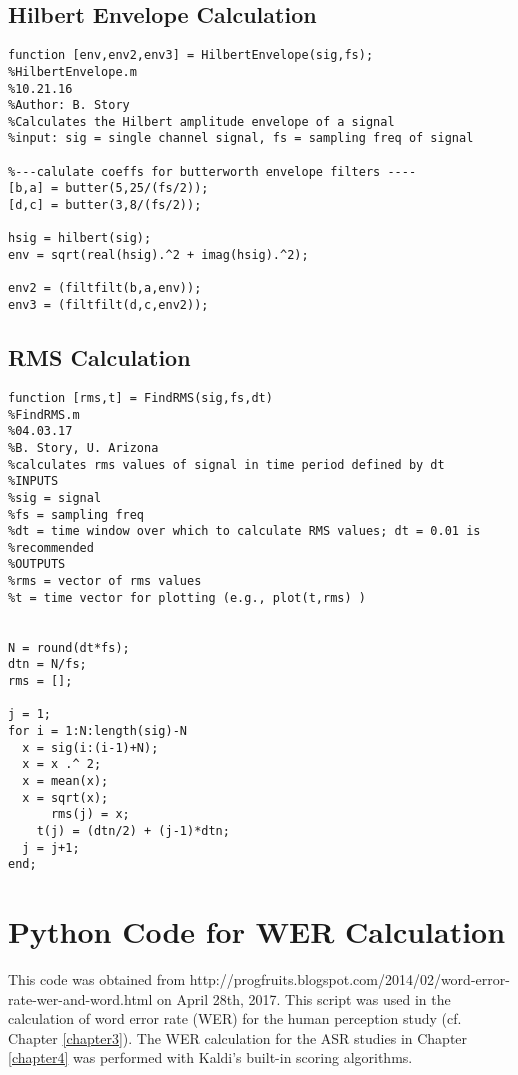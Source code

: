 \subsection{Hilbert Envelope Calculation}

\begin{lstlisting}
function [env,env2,env3] = HilbertEnvelope(sig,fs);
%HilbertEnvelope.m
%10.21.16
%Author: B. Story
%Calculates the Hilbert amplitude envelope of a signal
%input: sig = single channel signal, fs = sampling freq of signal

%---calulate coeffs for butterworth envelope filters ----
[b,a] = butter(5,25/(fs/2));
[d,c] = butter(3,8/(fs/2));

hsig = hilbert(sig);
env = sqrt(real(hsig).^2 + imag(hsig).^2);

env2 = (filtfilt(b,a,env));
env3 = (filtfilt(d,c,env2));
\end{lstlisting}


\subsection{RMS Calculation}

\begin{lstlisting}
function [rms,t] = FindRMS(sig,fs,dt)
%FindRMS.m
%04.03.17
%B. Story, U. Arizona
%calculates rms values of signal in time period defined by dt
%INPUTS
%sig = signal
%fs = sampling freq
%dt = time window over which to calculate RMS values; dt = 0.01 is
%recommended
%OUTPUTS
%rms = vector of rms values
%t = time vector for plotting (e.g., plot(t,rms) )


N = round(dt*fs);
dtn = N/fs;
rms = [];

j = 1;
for i = 1:N:length(sig)-N
  x = sig(i:(i-1)+N);
  x = x .^ 2;
  x = mean(x);
  x = sqrt(x);
      rms(j) = x;
    t(j) = (dtn/2) + (j-1)*dtn;
  j = j+1;
end;
\end{lstlisting}


\section{Python Code for WER Calculation}\label{python-code}

This code was obtained from http://progfruits.blogspot.com/2014/02/word-error-rate-wer-and-word.html on April 28th, 2017.  This script was used in the calculation of word error rate (WER) for the human perception study (cf. Chapter \ref{chapter3}).  The WER calculation for the ASR studies in Chapter \ref{chapter4} was performed with Kaldi's built-in scoring algorithms.

